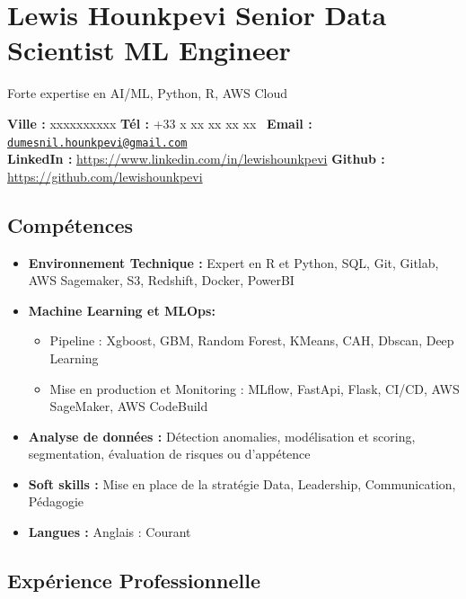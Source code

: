 \documentclass[
  letterpaper,
  DIV=11,
  numbers=noendperiod]{scrartcl}
\author{}
\date{}
\providecommand{\tightlist}{%
  \setlength{\itemsep}{0pt}\setlength{\parskip}{0pt}}\usepackage{longtable,booktabs,array}
\begin{document}
\pagestyle{mystyle}


\section{Lewis Hounkpevi \textbar{} Senior Data Scientist \textbar{} ML
Engineer}\label{lewis-hounkpevi-senior-data-scientist-ml-engineer}

\begin{center}Forte expertise en AI/ML, Python, R, AWS Cloud\end{center}

\textbf{Ville :} xxxxxxxxxx \textbar{} \textbf{Tél :} +33 x xx xx xx
xx~\textbar{} \textbf{Email :}
\href{mailto:dumesnil.hounkpevi@gmail.com}{\nolinkurl{dumesnil.hounkpevi@gmail.com}}~\\
\textbf{LinkedIn :} \url{https://www.linkedin.com/in/lewishounkpevi}
\textbar{} \textbf{Github :} \url{https://github.com/lewishounkpevi}

\subsection{Compétences}\label{compuxe9tences}

\begin{itemize}
\tightlist
\item
  \textbf{Environnement Technique :} Expert en R et Python, SQL, Git,
  Gitlab, AWS Sagemaker, S3, Redshift, Docker, PowerBI
\item
  \textbf{Machine Learning et MLOps:}

  \begin{itemize}
  \tightlist
  \item
    Pipeline : Xgboost, GBM, Random Forest, KMeans, CAH, Dbscan, Deep
    Learning
  \item
    Mise en production et Monitoring : MLflow, FastApi, Flask, CI/CD,
    AWS SageMaker, AWS CodeBuild
  \end{itemize}
\item
  \textbf{Analyse de données :} Détection anomalies, modélisation et
  scoring, segmentation, évaluation de risques ou d'appétence
\item
  \textbf{Soft skills :} Mise en place de la stratégie Data, Leadership,
  Communication, Pédagogie
\item
  \textbf{Langues :} Anglais : Courant
\end{itemize}

\subsection{Expérience
Professionnelle}\label{expuxe9rience-professionnelle}
\end{document}
